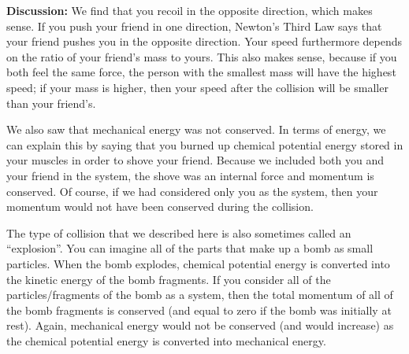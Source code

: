 \begin{example}
\textbf{Discussion:} We find that you recoil in the opposite direction, which makes sense. If you push your friend in one direction, Newton's Third Law says that your friend pushes you in the opposite direction. Your speed furthermore depends on the ratio of your friend's mass to yours. This also makes sense, because if you both feel the same force, the person with the smallest mass will have the highest speed; if your mass is higher, then your speed after the collision will be smaller than your friend's.

We also saw that mechanical energy was not conserved. In terms of energy, we can explain this by saying that you burned up chemical potential energy stored in your muscles in order to shove your friend. Because we included both you and your friend in the system, the shove was an internal force and momentum is conserved. Of course, if we had considered only you as the system, then your momentum would not have been conserved during the collision. 

The type of collision that we described here is also sometimes called an ``explosion''. You can imagine all of the parts that make up a bomb as small particles. When the bomb explodes, chemical potential energy is converted into the kinetic energy of the bomb fragments. If you consider all of the particles/fragments of the bomb as a system, then the total momentum of all of the bomb fragments is conserved (and equal to zero if the bomb was initially at rest). Again, mechanical energy would not be conserved (and would increase) as the chemical potential energy is converted into mechanical energy.
\end{example}


